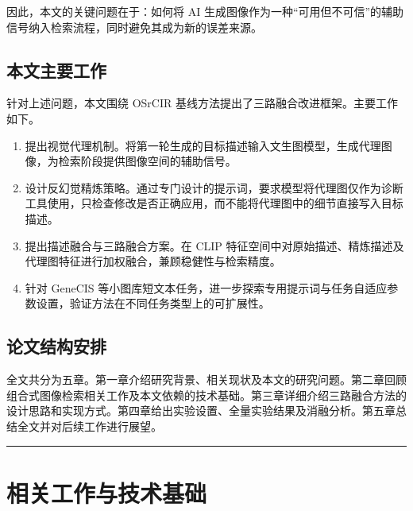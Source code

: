 \documentclass[12pt,a4paper,UTF8,oneside,openany]{ctexrep}
\begin{document}
因此，本文的关键问题在于：如何将 AI
生成图像作为一种``可用但不可信''的辅助信号纳入检索流程，同时避免其成为新的误差来源。

\hypertarget{ux672cux6587ux4e3bux8981ux5de5ux4f5c}{%
\subsection{本文主要工作}\label{ux672cux6587ux4e3bux8981ux5de5ux4f5c}}

针对上述问题，本文围绕 OSrCIR
基线方法提出了三路融合改进框架。主要工作如下。

\begin{enumerate}
\def\labelenumi{\arabic{enumi}.}
\item
  提出视觉代理机制。将第一轮生成的目标描述输入文生图模型，生成代理图像，为检索阶段提供图像空间的辅助信号。
\item
  设计反幻觉精炼策略。通过专门设计的提示词，要求模型将代理图仅作为诊断工具使用，只检查修改是否正确应用，而不能将代理图中的细节直接写入目标描述。
\item
  提出描述融合与三路融合方案。在 CLIP
  特征空间中对原始描述、精炼描述及代理图特征进行加权融合，兼顾稳健性与检索精度。
\item
  针对 GeneCIS
  等小图库短文本任务，进一步探索专用提示词与任务自适应参数设置，验证方法在不同任务类型上的可扩展性。
\end{enumerate}

\hypertarget{ux8bbaux6587ux7ed3ux6784ux5b89ux6392}{%
\subsection{论文结构安排}\label{ux8bbaux6587ux7ed3ux6784ux5b89ux6392}}

全文共分为五章。第一章介绍研究背景、相关现状及本文的研究问题。第二章回顾组合式图像检索相关工作及本文依赖的技术基础。第三章详细介绍三路融合方法的设计思路和实现方式。第四章给出实验设置、全量实验结果及消融分析。第五章总结全文并对后续工作进行展望。

\begin{center}\rule{0.5\linewidth}{0.5pt}\end{center}

\hypertarget{ux76f8ux5173ux5de5ux4f5cux4e0eux6280ux672fux57faux7840}{%
\section{相关工作与技术基础}\label{ux76f8ux5173ux5de5ux4f5cux4e0eux6280ux672fux57faux7840}}
\end{document}

